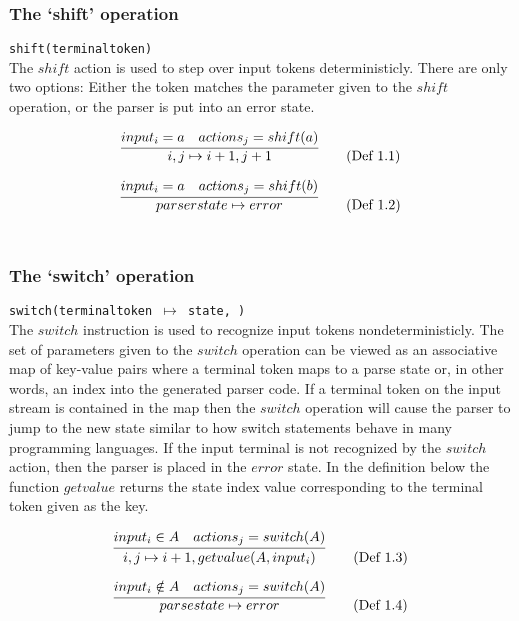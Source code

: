 \documentclass[a4paper,11pt]{article}
\begin{document}
\subsubsection{The `shift' operation}
\texttt{shift(terminaltoken)}\\
The $shift$ action is used to step over input tokens deterministicly. 
There are only two options: Either the token matches the parameter given to the $shift$ operation, or the parser is put into an error state.

\begin{equation}
\infer{i, j \mapsto i+1, j+1}{input_i = a & actions_j = shift(a)} \tag{Def 1.1}
\end{equation}

\begin{equation}
\infer{parserstate \mapsto error}{input_i = a & actions_j = shift(b)} \tag{Def 1.2}
\end{equation}\\

\subsubsection{The `switch' operation}
\texttt{switch(terminaltoken $\mapsto$ state, \textellipsis)}\\
The $switch$ instruction is used to recognize input tokens nondeterministicly.
The set of parameters given to the $switch$ operation can be viewed as an associative map of key-value pairs where a terminal token maps to a parse state or, in other words, an index into the generated parser code.
If a terminal token on the input stream is contained in the map then the $switch$ operation will cause the parser to jump to the new state similar to how switch statements behave in many programming languages.
If the input terminal is not recognized by the $switch$ action, then the parser is placed in the $error$ state. 
In the definition below the function $getvalue$ returns the state index value corresponding to the terminal token given as the key.

\begin{equation}
\infer{i, j \mapsto i+1, getvalue(A, input_i)}{input_i \in A & actions_j = switch(A)} \tag{Def 1.3}
\end{equation}

\begin{equation}
\infer{parsestate \mapsto error}{input_i \notin A & actions_j = switch(A)} \tag{Def 1.4}
\end{equation}\\
\end{document}
